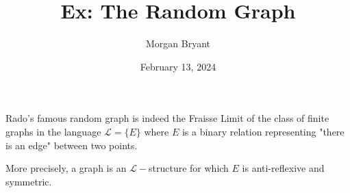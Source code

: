 \documentclass[a4paper]{article}
\title{Ex: The Random Graph}
\date{February 13, 2024}
\author{Morgan Bryant}
\begin{document}
\maketitle
\par{Rado's famous random graph is indeed the Fraisse Limit of the class of finite graphs in the language \(\mathcal {L} =  \{ E \}\) where \(E\) is a binary relation representing "there is an edge" between two points.}\par{More precisely, a graph is an \(\mathcal {L}-\)structure for which \(E\) is anti-reflexive and symmetric.}
\printbibliography
\end{document}
